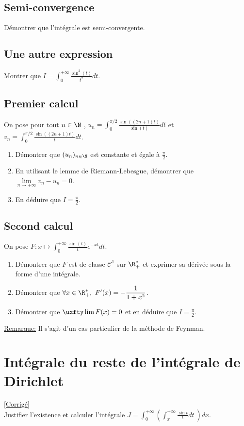 \documentclass{book}
\begin{document}
	\subsection{Semi-convergence }
	Démontrer que l'intégrale est semi-convergente.
	
	\subsection{Une autre expression }
	Montrer que $I=\displaystyle\int_0^{+\infty}\frac{\sin^2(t)}{t^2}dt$.
	
	\subsection{Premier calcul }
	On pose pour tout $n \in \N$ , $u_n=\displaystyle\int_0^{\pi/2} \frac{\sin((2n+1)t)}{\sin(t)}dt$ et $v_n=\displaystyle\int_0^{\pi/2} \frac{\sin((2n+1)t)}{t}dt$.
	\begin{enumerate}
		\item Démontrer que $(u_n)_{n\in \N}$ est constante et égale à $\displaystyle\frac{\pi}{2}$.
		\item En utilisant le lemme de Riemann-Lebesgue, démontrer que $\lim\limits_{n\to+\infty} v_n-u_n=0$.
		\item En déduire que $I=\displaystyle\frac{\pi}{2}$.
	\end{enumerate}
	
	\subsection{Second calcul }
	On pose $F:x\longmapsto \displaystyle\int_0^{+\infty}\frac{\sin(t)}{t}e^{-xt}dt$.
	\begin{enumerate}
		\item Démontrer que $F$ est de classe $\mathcal C^1$ sur $\R^*_+$ et exprimer sa dérivée sous la forme d'une intégrale.
		\item Démontrer que $\forall x \in \R^*_+,\ F'(x)=-\displaystyle\frac{1}{1+x^2}$.
		\item Démontrer que $\uxfty\lim F(x)=0$ et en déduire que $I=\displaystyle\frac{\pi}{2}$.
	\end{enumerate}
	\underline{Remarque:} Il s'agit d'un cas particulier de la méthode de Feynman.
	
	\section{Intégrale du reste de l'intégrale de Dirichlet }
	\textcolor{blue}{\hyperref[Intégrale du reste de l'intégrale de Dirichlet corrigé]{[Corrigé]}}\\
	\label{restedirichlet}
	\label{Intégrale du reste de l'intégrale de Dirichlet}
	Justifier l'existence et calculer l'intégrale $J=\displaystyle\int_0^{+\infty}\left(\int_x^{+\infty}\frac{\sin t}{t}dt\ \right)dx$.
	
\end{document}
